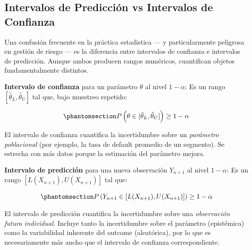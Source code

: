 \documentclass[
  spanish,
  11pt,
  letterpaper,
]{scrbook}
\theoremstyle{plain}
\theoremstyle{remark}
\begin{document}
\subsection{Intervalos de Predicción vs Intervalos de
Confianza}\label{sec-prediction-vs-confidence}

Una confusión frecuente en la práctica estadística --- y particularmente
peligrosa en gestión de riesgo --- es la diferencia entre intervalos de
confianza e intervalos de predicción. Aunque ambos producen rangos
numéricos, cuantifican objetos fundamentalmente distintos.

\textbf{Intervalo de confianza} para un parámetro \(\theta\) al nivel
\(1 - \alpha\): Es un rango \([\hat{\theta}_L, \hat{\theta}_U]\) tal
que, bajo muestreo repetido:

\begin{equation}\protect\phantomsection\label{eq-confidence-interval}{
P\left(\theta \in [\hat{\theta}_L, \hat{\theta}_U]\right) \geq 1 - \alpha
}\end{equation}

El intervalo de confianza cuantifica la incertidumbre sobre un
\emph{parámetro poblacional} (por ejemplo, la tasa de default promedio
de un segmento). Se estrecha con más datos porque la estimación del
parámetro mejora.

\textbf{Intervalo de predicción} para una nueva observación \(Y_{n+1}\)
al nivel \(1 - \alpha\): Es un rango \([L(X_{n+1}), U(X_{n+1})]\) tal
que:

\begin{equation}\protect\phantomsection\label{eq-prediction-interval}{
P\left(Y_{n+1} \in [L(X_{n+1}), U(X_{n+1})]\right) \geq 1 - \alpha
}\end{equation}

El intervalo de predicción cuantifica la incertidumbre sobre una
\emph{observación futura individual}. Incluye tanto la incertidumbre
sobre el parámetro (epistémica) como la variabilidad inherente del
outcome (aleatórica), por lo que es necesariamente más ancho que el
intervalo de confianza correspondiente.
\end{document}
